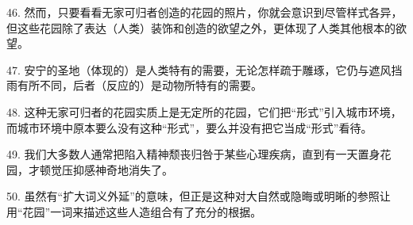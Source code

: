 46. 然而，只要看看无家可归者创造的花园的照片，你就会意识到尽管样式各异，但这些花园除了表达（人类）装饰和创造的欲望之外，更体现了人类其他根本的欲望。

47. 安宁的圣地（体现的）是人类特有的需要，无论怎样疏于雕琢，它仍与遮风挡雨有所不同，后者（反应的）是动物所特有的需要。

48. 这种无家可归者的花园实质上是无定所的花园，它们把“形式”引入城市环境，而城市环境中原本要么没有这种“形式”，要么并没有把它当成“形式”看待。

49. 我们大多数人通常把陷入精神颓丧归咎于某些心理疾病，直到有一天置身花园，才顿觉压抑感神奇地消失了。

50. 虽然有“扩大词义外延”的意味，但正是这种对大自然或隐晦或明晰的参照让用“花园”一词来描述这些人造组合有了充分的根据。